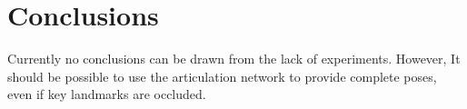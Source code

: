 \chapter{Conclusions}

Currently no conclusions can be drawn from the lack of experiments. However, It should be possible to use the articulation network to provide complete poses, even if key landmarks are occluded.
